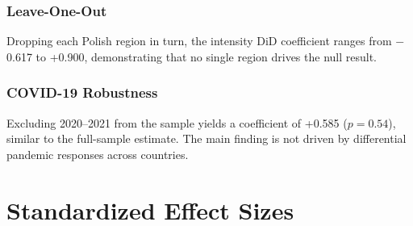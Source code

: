 \documentclass[12pt]{article}
\begin{document}
\subsubsection*{Leave-One-Out}  Dropping each Polish region in turn, the intensity DiD coefficient ranges from $-$0.617 to +0.900, demonstrating that no single region drives the null result.

\subsubsection*{COVID-19 Robustness}  Excluding 2020--2021 from the sample yields a coefficient of +0.585 ($p = 0.54$), similar to the full-sample estimate. The main finding is not driven by differential pandemic responses across countries.


\section{Standardized Effect Sizes}
\label{sec:sde}


\end{document}
